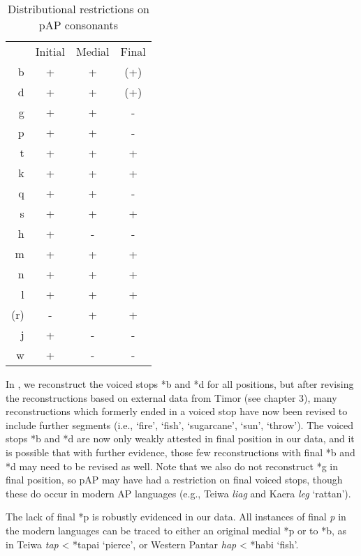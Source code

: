 \begin{table}\centering


\begin{tabular}{rccc}
  & Initial  & Medial  & Final\\
b  &  +  &  +  &  (+)\\
d  &  +  &  +  &  (+)\\
g  &  +  &  +  &  {}-\\
p  &  +  &  +  &  {}-\\
t  &  +  &  +  &  +\\
k  &  +  &  +  &  +\\
q  &  +  &  +  &  {}-\\
s  &  +  &  +  &  +\\
h  &  +  &  {}-  &  {}-\\
m  &  +  &  +  &  +\\
n  &  +  &  +  &  +\\
l  &  +  &  +  &  +\\
(r)  &  {}-  &  +  &  +\\
j  &  +  &  {}-  &  {}-\\
w  &  +  &  {}-  &  {}-\\


\end{tabular}
\caption{Distributional restrictions on pAP consonants}
\label{bkm:Ref214277415}
\end{table}

In \citep{HoltonEtAl2012}, we reconstruct the voiced stops *b and *d for all positions, but after revising the reconstructions based on external data from Timor (see chapter 3), many reconstructions which formerly ended in a voiced stop have now been revised to include further segments (i.e., `fire', `fish', `sugarcane', `sun', `throw'). The voiced stops *b and *d are now only weakly attested in final position in our data, and it is possible that with further evidence, those few reconstructions with final *b and *d may need to be revised as well. Note that we also do not reconstruct *g in final position, so pAP may have had a restriction on final voiced stops, though these do occur in modern AP languages (e.g., Teiwa \textit{lia{\textlengthmark}g} and Kaera\textit{ le{\textlengthmark}g} `rattan').

The lack of final *p is robustly evidenced in our data. All instances of final \textit{p }in the modern languages can be traced to either an original medial *p or to *b, as in Teiwa \textit{tap }{\textless} *tapai `pierce', or Western Pantar \textit{hap} {\textless} *habi `fish'.

